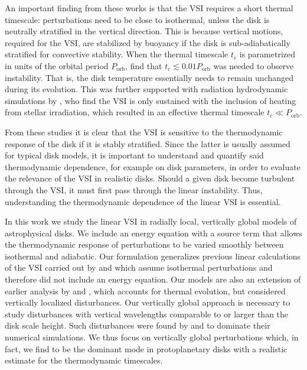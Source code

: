 \documentclass[iop]{emulateapj}
\begin{document}
An important finding from these works is that the VSI requires a short
thermal timescale: perturbations need to be close to
isothermal, unless the disk is neutrally stratified in the vertical
direction. This is because vertical motions, required for the VSI, are stabilized by
buoyancy if the disk is sub-adiabatically stratified for
convective stability. When the thermal timescale $t_c$ is parametrized
in units of the orbital period $P_\mathrm{orb}$, \cite{nelson13} find that
$t_c\lesssim 0.01P_\mathrm{orb}$ was needed to observe instability. That is, the
disk temperature essentially needs to remain unchanged during its
evolution. This was further supported with radiation hydrodynamic
simulations by \cite{stoll14}, who find the VSI is only sustained with
the inclusion of heating from stellar irradiation, which resulted in
an effective thermal timescale $t_c\ll P_\mathrm{orb}$. 

From these studies it is clear that the VSI is sensitive to
the thermodynamic response of the disk if it is stably
stratified. Since the latter is usually assumed for typical disk models,  
it is important to understand and quantify said thermodynamic dependence,
for example on disk parameters, in order to evaluate the relevance of
the VSI in realistic disks. Should a given disk become turbulent
through the VSI, it must first pass through the
linear instability. Thus, understanding the thermodynamic dependence
of the linear VSI is essential. 

In this work we study the linear VSI in radially local,
vertically global models of astrophysical disks. We include an energy
equation with a source term that allows the thermodynamic response of
perturbations to be varied smoothly between isothermal and adiabatic. Our
formulation generalizes previous linear calculations of the 
VSI carried out by \cite{nelson13} and \cite{mcnally14} which assume
isothermal perturbations and therefore did not include an energy
equation. Our models are also an extension of earlier 
analysis by \cite{urpin98} and \cite{urpin03}, which accounts for thermal
evolution, but considered vertically localized disturbances. Our 
vertically global approach is necessary to study disturbances with
vertical wavelengths comparable to or larger than the disk scale
height. Such disturbances were  found by \cite{nelson13} and
\cite{stoll14} to dominate their numerical simulations.  We thus focus
on vertically global perturbations which, in fact, we find to be the
dominant mode in protoplanetary disks with a realistic estimate for
the thermodynamic timescales. 
\end{document}
